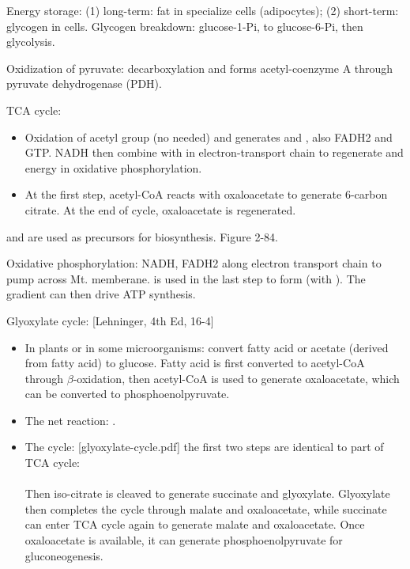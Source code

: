\documentclass{report}
\begin{document}
\begin{enumerate}

Energy storage: (1) long-term: fat in specialize cells (adipocytes); (2) short-term: glycogen in cells. Glycogen breakdown: glucose-1-Pi, to glucose-6-Pi, then glycolysis. 

Oxidization of pyruvate: decarboxylation and forms acetyl-coenzyme A through pyruvate dehydrogenase (PDH). 


TCA cycle: 
\begin{itemize}
	\item Oxidation of acetyl group (no  needed) and generates  and , also FADH2 and GTP. NADH then combine with  in electron-transport chain to regenerate  and energy in oxidative phosphorylation. 
	\item At the first step, acetyl-CoA reacts with oxaloacetate to generate 6-carbon citrate. At the end of cycle, oxaloacetate is regenerated. 
	

\end{itemize}

and are used as precursors for biosynthesis. Figure 2-84.

Oxidative phosphorylation: NADH, FADH2 along electron transport chain to pump  across Mt. memberane.  is used in the last step to form  (with ). The  gradient can then drive ATP synthesis. 

Glyoxylate cycle: [Lehninger, 4th Ed, 16-4]
\begin{itemize}
	\item In plants or in some microorganisms: convert fatty acid or acetate (derived from fatty acid) to glucose. Fatty acid is first converted to acetyl-CoA through $\beta$-oxidation, then acetyl-CoA is used to generate oxaloacetate, which can be converted to phosphoenolpyruvate. 
	\item The net reaction: . 
	\item The cycle: [glyoxylate-cycle.pdf] the first two steps are identical to part of TCA cycle:\\ \\ Then iso-citrate is cleaved to generate succinate and glyoxylate. Glyoxylate then completes the cycle through malate and oxaloacetate, while succinate can enter TCA cycle again to generate malate and oxaloacetate. Once oxaloacetate is available, it can generate phosphoenolpyruvate for gluconeogenesis. 
\end{itemize}


\end{enumerate}
\end{document}
